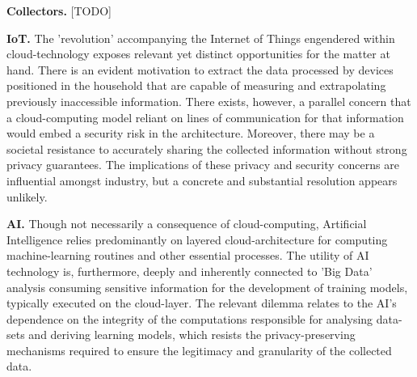 \documentclass[twocolumn]{scrartcl}
\begin{document}
\textbf{Collectors.} [TODO] %

\textbf{IoT.} The 'revolution' accompanying the Internet of Things engendered within cloud-technology exposes relevant yet distinct opportunities for the matter at hand. There is an evident motivation to extract the data processed by devices positioned in the household that are capable of measuring and extrapolating previously inaccessible information. There exists, however, a parallel concern that a cloud-computing model reliant on lines of communication for that information would embed a security risk in the architecture. Moreover, there may be a societal resistance to accurately sharing the collected information without strong privacy guarantees. The implications of these privacy and security concerns are influential amongst industry, but a concrete and substantial resolution appears unlikely.

\textbf{AI.} Though not necessarily a consequence of cloud-computing, Artificial Intelligence relies predominantly on layered cloud-architecture for computing machine-learning routines and other essential processes. The utility of AI technology is, furthermore, deeply and inherently connected to 'Big Data' analysis consuming sensitive information for the development of training models, typically executed on the cloud-layer. The relevant dilemma relates to the AI's dependence on the integrity of the computations responsible for analysing data-sets and deriving learning models, which resists the privacy-preserving mechanisms required to ensure the legitimacy and granularity of the collected data.
\end{document}
